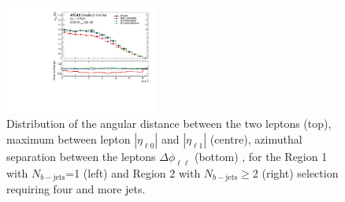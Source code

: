 \begin{figure}[!htb]
\includegraphics[width=0.45\textwidth]{Plots/ttV/generator/c_Region_1_lep_dPhi} 
  \caption{Distribution of the angular distance between the two leptons (top), maximum between lepton $|\eta_{\ell 0}|$ and $|\eta_{\ell 1}|$ (centre), azimuthal separation between the leptons $\Delta \phi _{\ell \ell }$ (bottom) , for the Region 1 with $N_{b-\mathrm{jets}}$=1 (left) and Region 2 with $N_{b-\mathrm{jets}}\geq$2 (right) selection requiring four and more jets. 
   \label{ttV:den_ll_kin}}
\end{figure}
% 



